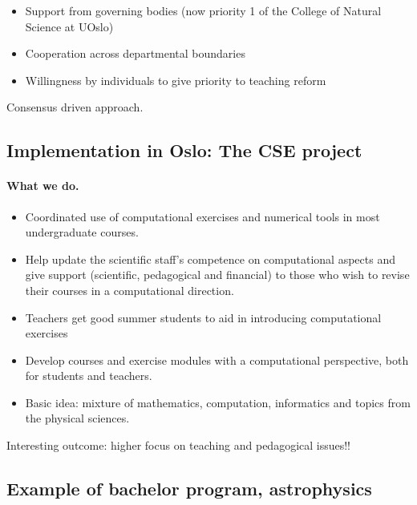\documentclass[%
twoside,                 %
final,                   %
10pt]{article}
\begin{document}
\begin{itemize}
\item Support from governing bodies (now priority 1 of the College of Natural Science at UOslo)

\item Cooperation across departmental boundaries

\item Willingness by individuals to give priority to teaching reform
\end{itemize}

\noindent
Consensus driven approach.





\subsection{Implementation in Oslo: The CSE  project}

\paragraph{What we do.}
\begin{itemize}
\item Coordinated use of computational exercises and numerical tools in most undergraduate courses.

\item Help update the scientific staff's competence on computational aspects and give support (scientific, pedagogical and financial)  to those who wish to revise  their courses in a computational direction.

\item Teachers get good summer students to aid in introducing computational exercises

\item Develop courses and exercise modules with a computational perspective, both for students and teachers. 

\item Basic idea: mixture of mathematics, computation, informatics and topics from the physical sciences.
\end{itemize}

\noindent
Interesting outcome: higher focus on teaching and pedagogical issues!!




\subsection{Example of bachelor program, astrophysics}
\end{document}

